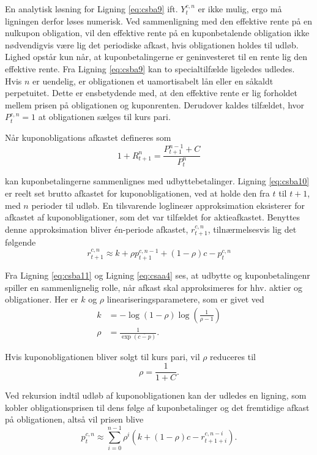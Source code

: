 \documentclass[
  a4paper,
  oneside]{memoir}
\begin{document}
En analytisk løsning for Ligning \eqref{eq:csba9} ift. \(Y_t^{c,n}\) er ikke mulig, ergo må ligningen derfor løses numerisk. Ved sammenligning med den effektive rente på en nulkupon obligation, vil den effektive rente på en kuponbetalende obligation ikke nødvendigvis være lig det periodiske afkast, hvis obligationen holdes til udløb. Lighed opstår kun når, at kuponbetalingerne er geninvesteret til en rente lig den effektive rente. Fra Ligning \eqref{eq:csba9} kan to specialtilfælde ligeledes udledes. Hvis \(n\) er uendelig, er obligationen et uamortisabelt lån eller en såkaldt perpetuitet. Dette er ensbetydende med, at den effektive rente er lig forholdet mellem prisen på obligationen og kuponrenten. Derudover kaldes tilfældet, hvor \(P_t^{c,n}=1\) at obligationen sælges til kurs pari.

Når kuponobligations afkastet defineres som
\begin{equation}
1+R_{t+1}^n = \frac{P_{t+1}^{n-1}+C}{P_t^n} \label{eq:csba10}
\end{equation}

kan kuponbetalingerne sammenlignes med udbyttebetalinger. Ligning \eqref{eq:csba10} er reelt set brutto afkastet for kuponobligationen, ved at holde den fra \(t\) til \(t+1\), med \(n\) perioder til udløb. En tilsvarende loglineær approksimation eksisterer for afkastet af kuponobligationer, som det var tilfældet for aktieafkastet. Benyttes denne approksimation bliver én-periode afkastet, \(r_{t+1}^{c,n}\), tilnærmelsesvis lig det følgende
\begin{equation}
r_{t+1}^{c,n}\approx k + \rho p_{t+1}^{c,n-1} + (1-\rho)c - p_t^{c,n} \label{eq:csba11}
\end{equation}

Fra Ligning \eqref{eq:csba11} og Ligning \eqref{eq:csaa4} ses, at udbytte og kuponbetalingenr spiller en sammenlignelig rolle, når afkast skal approksimeres for hhv. aktier og obligationer. Her er \(k\) og \(\rho\) lineariseringsparametere, som er givet ved
\begin{align*}
k &= -\log(1-\rho)\log\left(\frac{1}{\rho-1}\right)\\
\rho&= \frac{1}{\exp\left(\overline{c-p}\right)}.
\end{align*}

Hvis kuponobligationen bliver solgt til kurs pari, vil \(\rho\) reduceres til
\[\rho=\frac{1}{1+C}.\]

Ved rekursion indtil udløb af kuponobligationen kan der udledes en ligning, som kobler obligationsprisen til dens følge af kuponbetalinger og det fremtidige afkast på obligationen, altså vil prisen blive
\begin{equation}
p_t^{c,n}\approx\sum_{i=0}^{n-1} \rho^i \left(k+(1-\rho)c - r_{t+1+i}^{c,n-i}\right). \label{eq:csba12}
\end{equation}
\end{document}
